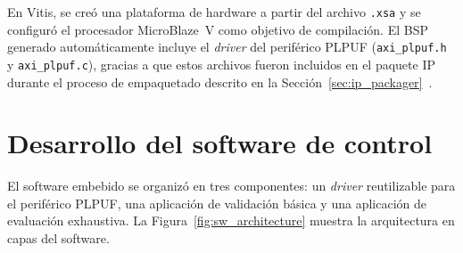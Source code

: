 En Vitis, se creó una plataforma de hardware a partir del archivo
\texttt{.xsa} y se configuró el procesador MicroBlaze~V como objetivo de
compilación. El BSP generado automáticamente incluye el \textit{driver}
del periférico PLPUF (\texttt{axi\_plpuf.h} y \texttt{axi\_plpuf.c}), gracias
a que estos archivos fueron incluidos en el paquete IP durante el proceso de
empaquetado descrito en la Sección~\ref{sec:ip_packager}~\cite{ug1701}.

\section{Desarrollo del software de control}
\label{sec:software}

El software embebido se organizó en tres componentes: un \textit{driver}
reutilizable para el periférico PLPUF, una aplicación de validación básica
y una aplicación de evaluación exhaustiva. La
Figura~\ref{fig:sw_architecture} muestra la arquitectura en capas del
software.

